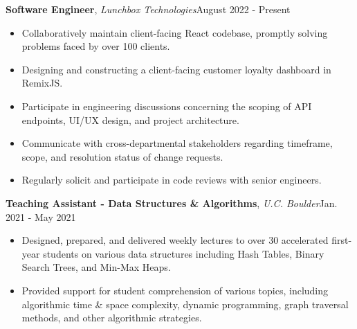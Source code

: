 \documentclass[12pt]{article}
\begin{document}
\begin{flushleft}

  \hrulefill {} \quad \hrulefill

  \vspace{2mm}

  {\textbf{Software Engineer}}, \textit{Lunchbox Technologies}\hfill August 2022 - Present
  \vspace{-2mm}
  \begin{itemize} \setlength\itemsep{-0.3em}
      \item Collaboratively maintain client-facing React codebase, promptly solving problems faced by over 100 clients.
      \item Designing and constructing a client-facing customer loyalty dashboard in RemixJS. 
      \item Participate in engineering discussions concerning the scoping of API endpoints, UI/UX design, and project architecture.
      \item Communicate with cross-departmental stakeholders regarding timeframe, scope, and resolution status of change requests.
      \item Regularly solicit and participate in code reviews with senior engineers.
  \end{itemize}

  {\textbf{Teaching Assistant - Data Structures \& Algorithms}}, \textit{U.C. Boulder}\hfill Jan. 2021 - May 2021
  \vspace{-2mm}
  \begin{itemize} \setlength\itemsep{-0.3em}
    \item Designed, prepared, and delivered weekly lectures to over 30 accelerated first-year students on various data structures including Hash Tables, Binary Search Trees, and Min-Max Heaps. %
    \item Provided support for student comprehension of various topics, including algorithmic time \& space complexity, dynamic programming, graph traversal methods, and other algorithmic strategies.
  \end{itemize}

\end{flushleft}

\vspace{-8mm}
\end{document}
